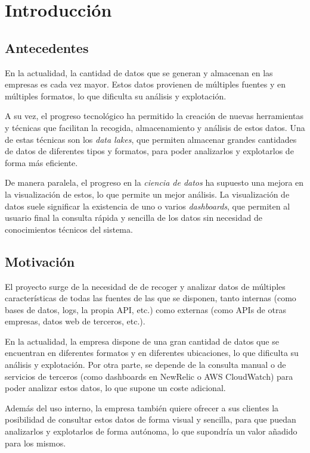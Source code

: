 \chapter{Introducción}\label{chap:intro}
\section{Antecedentes}\label{sec:antecedentes}
En la actualidad, la cantidad de datos que se generan y almacenan en las empresas es cada vez
mayor. Estos datos provienen de múltiples fuentes y en múltiples formatos, lo que dificulta su
análisis y explotación.

A su vez, el progreso tecnológico ha permitido la creación de nuevas herramientas y técnicas
que facilitan la recogida, almacenamiento y análisis de estos datos. Una de estas técnicas son
los \textit{data lakes}, que permiten almacenar grandes cantidades de datos de diferentes
tipos y formatos, para poder analizarlos y explotarlos de forma más eficiente.

De manera paralela, el progreso en la \textit{ciencia de datos} ha supuesto una mejora en la
visualización de estos, lo que permite un mejor análisis. La visualización de datos suele
significar la existencia de uno o varios \textit{dashboards}, que permiten al usuario final
la consulta rápida y sencilla de los datos sin necesidad de conocimientos técnicos del sistema.

\section{Motivación}\label{sec:motivacion}
El proyecto surge de la necesidad de  de recoger y analizar
datos de múltiples características de todas las fuentes de las que se disponen, tanto internas
(como bases de datos, logs, la propia API, etc.) como externas (como APIs de otras empresas,
datos web de terceros, etc.).

En la actualidad, la empresa dispone de una gran cantidad de datos que se encuentran en
diferentes formatos y en diferentes ubicaciones, lo que dificulta su análisis y explotación.
Por otra parte, se depende de la consulta manual o de servicios de terceros (como dashboards
en NewRelic o AWS CloudWatch) para poder analizar estos datos, lo que supone un coste adicional.

Además del uso interno, la empresa también quiere ofrecer a sus clientes la posibilidad de
consultar estos datos de forma visual y sencilla, para que puedan analizarlos y explotarlos de
forma autónoma, lo que supondría un valor añadido para los mismos.

